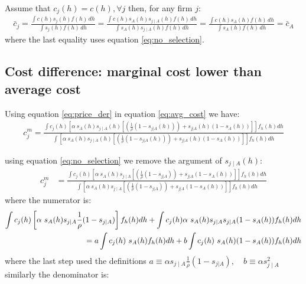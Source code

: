 \documentclass[12pt]{article}
\theoremstyle{plain}
\theoremstyle{plain}
\begin{document}
Assume that $c_j(h) = c(h), \forall j$ then, for any firm $j$: 
\begin{align}
\bar{c}_j = \frac{\int c(h)s_j(h)f(h)\,dh}{\int s_j(h)f(h)\,dh} = \frac{\int c(h)s_A(h) s_{j\mid A}(h)f(h)\,dh}{\int s_A(h) s_{j\mid A}(h)f(h)\,dh} 
=  \frac{\int c(h)s_A(h) f(h)\,dh}{\int s_A(h) f(h)\,dh} = \bar{c}_A    
\end{align}
where the last equality uses equation \ref{eq:no_selection}. 

\bigskip

\subsection{Cost difference: marginal cost lower than average cost}\label{sec:appendix3}



Using equation \ref{eq:price_der} in equation \ref{eq:avg_cost} we have: 
\begin{align}
    c^m_j = \frac{\int c_j(h) \left[\alpha \ s_A(h) s_{j\mid A}(h) \left[ \left(\frac{1}{\rho}(1-s_{j|A}(h))\right)  + s_{j|A}(h)  (1-s_A(h)) \right]  \right]  f_h(h) dh }{\int  \left[\alpha \ s_A(h) s_{j\mid A}(h) \left[ \left(\frac{1}{\rho}(1-s_{j|A}(h))\right)  + s_{j|A}(h)  (1-s_A(h)) \right]  \right]  f_h(h) dh }
\end{align}


using equation \ref{eq:no_selection} we remove the argument of $s_{j\mid A}(h)$: 
\begin{align}
    c^m_j 
    &= \frac{\int c_j(h) \left[\alpha \ s_A(h) s_{j\mid A} \left[ \left(\frac{1}{\rho}(1-s_{j|A})\right)  + s_{j|A}  (1-s_A(h)) \right]  \right]  f_h(h) dh }{\int  \left[\alpha \ s_A(h) s_{j\mid A} \left[ \left(\frac{1}{\rho}(1-s_{j|A})\right)  + s_{j|A}  (1-s_A(h)) \right]  \right]  f_h(h) dh } 
\end{align}
where the numerator is:
\begin{align}\label{eq:numerator}
  \int c_j(h) \left[\alpha \ s_A(h) s_{j\mid A} \frac{1}{\rho}(1-s_{j|A}) \right]  f_h(h) dh +\int c_j(h)\alpha \ s_A(h) s_{j\mid A}  s_{j|A}  (1-s_A(h))  f_h(h) dh \notag \\  
    = a \int c_j(h)  \ s_A(h) f_h(h) dh +b \int c_j(h) \ s_A(h)    (1-s_A(h))  f_h(h) dh  
\end{align}
where the last step used the definitions $a\equiv  \alpha s_{j\mid A} \frac{1}{\rho}(1-s_{j|A}), \quad b \equiv \alpha s_{j\mid A}^2 $
similarly the  denominator is: 
\end{document}
